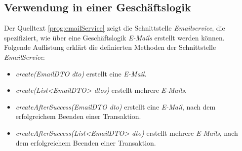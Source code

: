 \subsection{Verwendung in einer Geschäftslogik}
Der Quelltext \ref{prog:emailService} zeigt die Schnittstelle \emph{Emailservice}, die spezifiziert, wie über eine Geschäftslogik \emph{E-Mails} erstellt werden können. Folgende Auflistung erklärt die definierten Methoden der Schnittstelle \emph{EmailService}:
\begin{itemize}
	\item\emph{create(EmailDTO dto)} erstellt eine \emph{E-Mail}.
	\item\emph{create(List<EmailDTO> dtos)} erstellt mehrere \emph{E-Mails}.
	\item\emph{createAfterSuccess(EmailDTO dto)} erstellt eine \emph{E-Mail}, nach dem erfolgreichem Beenden einer Transaktion.
	\item\emph{createAfterSuccess(List<EmailDTO> dto)} erstellt mehrere \emph{E-Mails}, nach dem erfolgreichem Beenden einer Transaktion.
\end{itemize} 
\ \newpage

